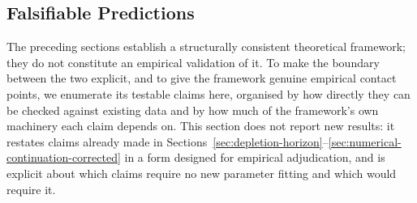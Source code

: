 \documentclass[twocolumn,10pt]{article}
\begin{document}
\subsection{Falsifiable Predictions}
\label{sec:falsifiable-predictions}
The preceding sections establish a structurally consistent theoretical framework; they do not constitute an empirical validation of it. To make the boundary between the two explicit, and to give the framework genuine empirical contact points, we enumerate its testable claims here, organised by how directly they can be checked against existing data and by how much of the framework's own machinery each claim depends on. This section does not report new results: it restates claims already made in Sections~\ref{sec:depletion-horizon}--\ref{sec:numerical-continuation-corrected} in a form designed for empirical adjudication, and is explicit about which claims require no new parameter fitting and which would require it.
\end{document}
